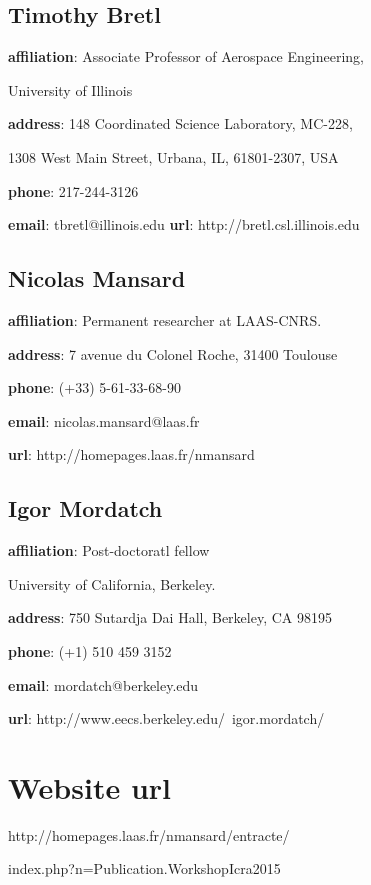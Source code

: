 \documentclass[conference]{IEEEtran}
\begin{document}
\subsection*{Timothy Bretl}
\textbf{affiliation}: Associate Professor of Aerospace Engineering,

 University of Illinois

\textbf{address}: 148 Coordinated Science Laboratory, MC-228,

 1308 West Main Street, Urbana, IL, 61801-2307, USA 

\textbf{phone}: 217-244-3126 

\textbf{email}: tbretl@illinois.edu 
\textbf{url}: http://bretl.csl.illinois.edu

\subsection*{Nicolas Mansard}
\textbf{affiliation}: Permanent researcher at LAAS-CNRS.

\textbf{address}: 7 avenue du Colonel Roche, 31400 Toulouse

\textbf{phone}: (+33) 5-61-33-68-90

\textbf{email}: nicolas.mansard@laas.fr

\textbf{url}: http://homepages.laas.fr/nmansard

\subsection*{Igor Mordatch}
\textbf{affiliation}: Post-doctoratl fellow 

University of California, Berkeley.

\textbf{address}: 750 Sutardja Dai Hall, Berkeley, CA 98195

\textbf{phone}: (+1) 510 459 3152

\textbf{email}: mordatch@berkeley.edu

\textbf{url}: http://www.eecs.berkeley.edu/~igor.mordatch/


\section{Website url}
http://homepages.laas.fr/nmansard/entracte/

index.php?n=Publication.WorkshopIcra2015
\end{document}
